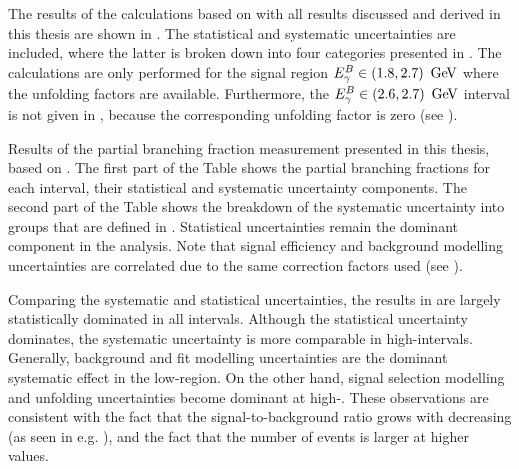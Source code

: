 The results of the calculations based on  with all 
results discussed and derived in this thesis are shown in .
The statistical and systematic uncertainties are included, where the latter is broken down into four categories presented in .
The calculations are only performed for the signal region ${E^B_{\gamma}}\in(1.8,2.7)~\mathrm{\,Ge\kern -0.1em V}$ where the unfolding factors are available.
Furthermore, the ${E^B_{\gamma}}\in(2.6,2.7)~\mathrm{\,Ge\kern -0.1em V}$ interval is not given in , 
because the corresponding unfolding factor is zero (see ).

\begin{table}[hbtp!]
    \centering
    \caption{\label{tab:partial_branching_fractions}
    Results of the partial branching fraction measurement presented in this thesis, based on . 
    The first part of the Table shows the partial branching fractions for each \EB interval, their statistical and systematic uncertainty components.
    The second part of the Table shows the breakdown of the systematic uncertainty into groups that are defined in . 
    Statistical uncertainties remain the dominant component in the analysis.
    Note that signal efficiency and background modelling uncertainties are correlated due to the same correction factors used (see ).
    }
    
\end{table}

Comparing the systematic and statistical uncertainties, the results in  
are largely statistically dominated in all \EB intervals.
Although the statistical uncertainty dominates, the systematic uncertainty is more comparable in high-\EB intervals.
Generally, background and fit modelling uncertainties are the dominant systematic effect in the low-\EB region.
On the other hand, signal selection modelling and unfolding uncertainties become dominant at high-\EB.
These observations are consistent with the fact that the signal-to-background ratio grows with decreasing \EB (as seen in e.g. ),
and the fact that the number of \BtoXsgamma events is larger at higher \EB values.

